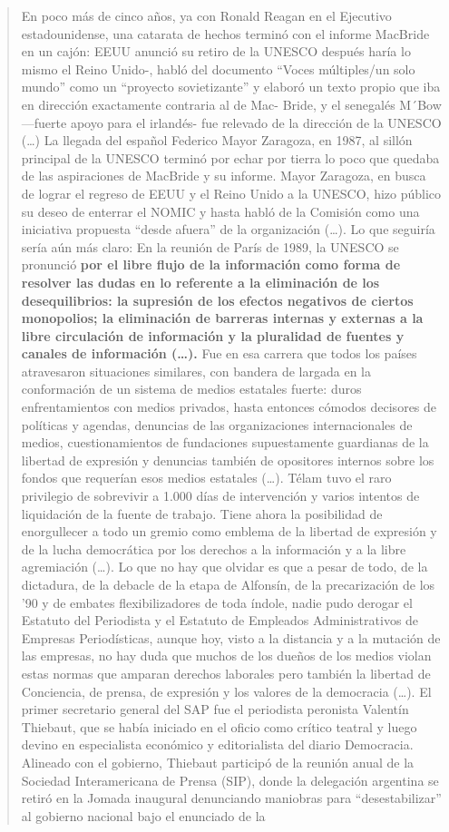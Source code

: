 {\begin{quote}
En poco más de cinco años, ya con Ronald Reagan en el Ejecutivo estadounidense, una catarata de hechos terminó con el informe MacBride en un cajón: EEUU anunció su retiro de la UNESCO después haría lo mismo el Reino Unido-, habló del documento ``Voces múltiples/un solo mundo'' como un ``proyecto sovietizante'' y elaboró un texto propio que iba en dirección exactamente contraria al de Mac- Bride, y el senegalés M´Bow ---fuerte apoyo para el irlandés- fue relevado de la dirección de la UNESCO (\ldots) La llegada del español Federico Mayor Zaragoza, en 1987, al sillón principal de la UNESCO terminó por echar por tierra lo poco que quedaba de las aspiraciones de MacBride y su informe. Mayor Zaragoza, en busca de lograr el regreso de EEUU y el Reino Unido a la UNESCO, hizo público su deseo de enterrar el NOMIC y hasta habló de la Comisión como una iniciativa propuesta ``desde afuera'' de la organización (\ldots). Lo que seguiría sería aún más claro: En la reunión de París de 1989, la UNESCO se pronunció \textbf{por el libre flujo de la información como forma de resolver las dudas en lo referente a la eliminación de los desequilibrios: la supresión de los efectos negativos de ciertos monopolios; la eliminación de barreras internas y externas a la libre circulación de información y la pluralidad de fuentes y canales de información (\ldots).} Fue en esa carrera que todos los países atravesaron situaciones similares, con bandera de largada en la conformación de un sistema de medios estatales fuerte: duros enfrentamientos con medios privados, hasta entonces cómodos decisores de políticas y agendas, denuncias de las organizaciones internacionales de medios, cuestionamientos de fundaciones supuestamente guardianas de la libertad de expresión y denuncias también de opositores internos sobre los fondos que requerían esos medios estatales (\ldots). Télam tuvo el raro privilegio de sobrevivir a 1.000 días de intervención y varios intentos de liquidación de la fuente de trabajo. Tiene ahora la posibilidad de enorgullecer a todo un gremio como emblema de la libertad de expresión y de la lucha democrática por los derechos a la información y a la libre agremiación (\ldots). Lo que no hay que olvidar es que a pesar de todo, de la dictadura, de la debacle de la etapa de Alfonsín, de la precarización de los '90 y de embates flexibilizadores de toda índole, nadie pudo derogar el Estatuto del Periodista y el Estatuto de Empleados Administrativos de Empresas Periodísticas, aunque hoy, visto a la distancia y a la mutación de las empresas, no hay duda que muchos de los dueños de los medios violan estas normas que amparan derechos laborales pero también la libertad de Conciencia, de prensa, de expresión y los valores de la democracia (\ldots). El primer secretario general del SAP fue el periodista peronista Valentín Thiebaut, que se había iniciado en el oficio como crítico teatral y luego devino en especialista económico y editorialista del diario Democracia. Alineado con el gobierno, Thiebaut participó de la reunión anual de la Sociedad Interamericana de Prensa (SIP), donde la delegación argentina se retiró en la Jomada inaugural denunciando maniobras para ``desestabilizar'' al gobierno nacional bajo el enunciado de la 
\end{quote}}
